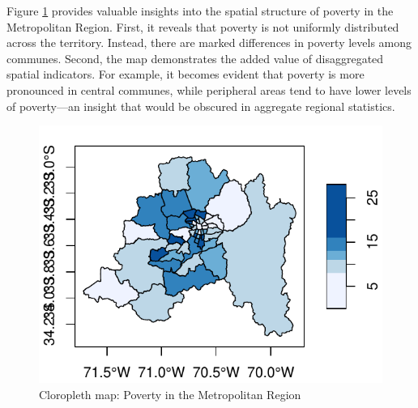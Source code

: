 \begin{knitrout}
\color{fgcolor}\begin{kframe}
\begin{alltt}
\hldef{(}\hldef{)}
\hldef{(mr[}\hldef{],}
        \hldef{=} \hldef{,}
        \hldef{=} \hldef{,}
        \hldef{=} \hldef{(}\hldef{,} \hldef{),}
        \hldef{=} \hldef{,}
        \hldef{=} \hldef{)}
\end{alltt}
\end{kframe}
\end{knitrout}

Figure \ref{fig:cloro-graph} provides valuable insights into the spatial structure of poverty in the Metropolitan Region. First, it reveals that poverty is not uniformly distributed across the territory. Instead, there are marked differences in poverty levels among communes. Second, the map demonstrates the added value of disaggregated spatial indicators. For example, it becomes evident that poverty is more pronounced in central communes, while peripheral areas tend to have lower levels of poverty—an insight that would be obscured in aggregate regional statistics.


\begin{figure}
\caption{Cloropleth map: Poverty in the Metropolitan Region}\label{fig:cloro-graph}
\begin{knitrout}
\color{fgcolor}

{\centering \includegraphics[width=\maxwidth]{figure/cloro-graphs-1} 

}


\end{knitrout}
\end{figure}

